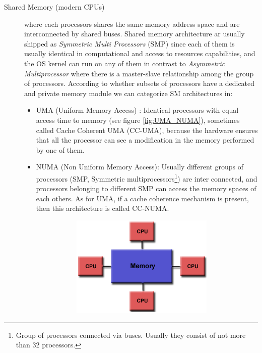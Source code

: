 \begin{description}
\begin{description}
	\item [Shared Memory (modern CPUs)] where each processors shares the same memory address space and are interconnected by shared buses. 
	Shared memory architecture ar usually shipped as \textit{Symmetric Multi Processors} (SMP) since each of them is usually identical in computational and access to resources capabilities, and the OS kernel can run on any of them in contrast to \textit{Asymmetric Multiprocessor} where there is a master-slave relationship  among the group of processors. According to whether subsets of processors have a dedicated and private memory module we can categorize SM architectures in:	
	\begin{itemize}
		\item UMA (Uniform Memory Access) : Identical processors with equal
		access time to memory (see figure \ref{fig:UMA_NUMA}),
		sometimes called  Cache Coherent UMA (CC-UMA), because the
		hardware ensures that all the processor can see a modification in the memory 	performed by one of them.
		\item NUMA (Non Uniform Memory Access): Usually different groups
		of processors (SMP, Symmetric multiprocessors\footnote{Group of processors connected via buses. Usually they consist of not more than 32 processors.}) are inter connected, and processors belonging to different SMP can access the memory spaces of each others. As for UMA, if a cache coherence mechanism  is present, then this architecture is called CC-NUMA.
		 \begin{figure}[b]
			\caption[Shared memory architectures.]{UMA and NUMA shared memory architecture.}
			\label{fig:UMA_NUMA}
			\centering
			\begin{subfigure}[b]{0.5\textwidth}
				\centering
				\includegraphics[width=0.92\textwidth]{./images/parallel_programming/shared_mem}

\end{subfigure}
\end{figure}
\end{itemize}
\end{description}
\end{description}
